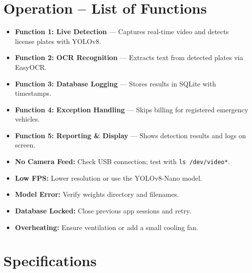 \section{Operation – List of Functions}

\begin{itemize}
	\item \textbf{Function 1: Live Detection} — Captures real-time video and detects license plates with YOLOv8.
	\item \textbf{Function 2: OCR Recognition} — Extracts text from detected plates via EasyOCR.
	\item \textbf{Function 3: Database Logging} — Stores results in SQLite with timestamps.
	\item \textbf{Function 4: Exception Handling} — Skips billing for registered emergency vehicles.
	\item \textbf{Function 5: Reporting \& Display} — Shows detection results and logs on screen.
\end{itemize}

\begin{tcolorbox}[colback=red!5!white,colframe=red!60!black,title={\faTools\hspace{0.5em}Quick Troubleshooting Hint }]
	\begin{itemize}
		\item \textbf{No Camera Feed:} Check USB connection; test with \texttt{ls /dev/video*}.
		\item \textbf{Low FPS:} Lower resolution or use the YOLOv8-Nano model.
		\item \textbf{Model Error:} Verify weights directory and filenames.
		\item \textbf{Database Locked:} Close previous app sessions and retry.
		\item \textbf{Overheating:} Ensure ventilation or add a small cooling fan.
	\end{itemize}
\end{tcolorbox}

\section{Specifications}

